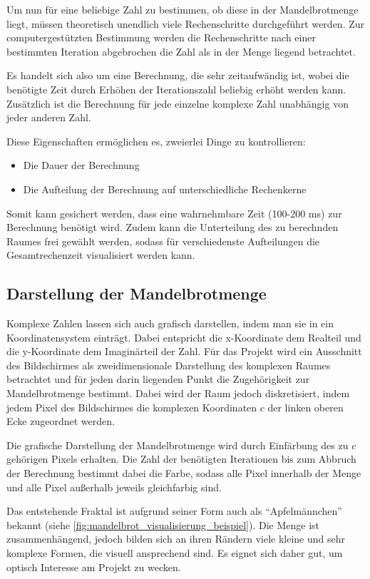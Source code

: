 Um nun für eine beliebige Zahl zu bestimmen, ob diese in der Mandelbrotmenge liegt, müssen
theoretisch unendlich viele Rechenschritte durchgeführt werden. Zur computergestützten Bestimmung
werden die Rechenschritte nach einer bestimmten Iteration abgebrochen die Zahl als in der Menge liegend betrachtet.

Es handelt sich also um eine Berechnung, die sehr zeitaufwändig ist, wobei
die benötigte Zeit durch Erhöhen der Iterationszahl beliebig erhöht werden kann.
Zusätzlich ist die Berechnung für jede einzelne komplexe Zahl unabhängig von
jeder anderen Zahl.

Diese Eigenschaften ermöglichen es, zweierlei Dinge zu kontrollieren:
\begin{itemize}
    \item Die Dauer der Berechnung
    \item Die Aufteilung der Berechnung auf unterschiedliche Rechenkerne
\end{itemize}

Somit kann gesichert werden, dass eine wahrnehmbare Zeit (100-200 ms) zur Berechnung benötigt wird.
Zudem kann die Unterteilung des zu berechnden Raumes frei gewählt werden, sodass
für verschiedenste Aufteilungen die Gesamtrechenzeit visualisiert werden kann.

\subsection{Darstellung der Mandelbrotmenge}

Komplexe Zahlen lassen sich auch grafisch darstellen, indem man sie in ein Koordinatensystem einträgt.
Dabei entspricht die x-Koordinate dem Realteil und die y-Koordinate dem Imaginärteil der Zahl.
Für das Projekt wird ein Ausschnitt des Bildschirmes als zweidimensionale Darstellung des komplexen Raumes
betrachtet und für jeden darin liegenden Punkt die Zugehörigkeit zur Mandelbrotmenge bestimmt.
Dabei wird der Raum jedoch diskretisiert, indem jedem Pixel des Bildschirmes die komplexen Koordinaten $c$
der linken oberen Ecke zugeordnet werden.

Die grafische Darstellung der Mandelbrotmenge wird durch Einfärbung des zu $c$ gehörigen Pixels erhalten.
Die Zahl der benötigten Iterationen bis zum Abbruch der Berechnung bestimmt dabei die Farbe, sodass alle Pixel
innerhalb der Menge und alle Pixel außerhalb jeweils gleichfarbig sind.

Das entstehende Fraktal ist aufgrund seiner Form auch als “Apfelmännchen” bekannt (siehe \autoref{fig:mandelbrot_visualisierung_beispiel}).
Die Menge ist zusammenhängend, jedoch bilden sich an ihren Rändern viele kleine und sehr komplexe Formen, die visuell ansprechend sind. Es eignet sich daher gut, um optisch Interesse am Projekt zu wecken.

